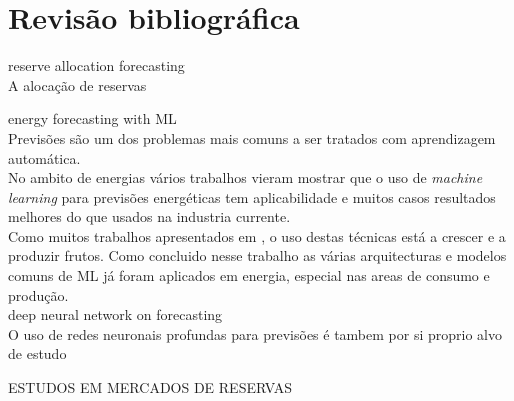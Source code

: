 \chapter{Revisão bibliográfica}

reserve allocation forecasting \\
A alocação de reservas 


energy forecasting with ML \\
Previsões são um dos problemas mais comuns a ser tratados com aprendizagem automática. \cite{} \\
No ambito de energias vários trabalhos vieram mostrar que o uso de \textit{machine learning} para previsões energéticas tem aplicabilidade e muitos casos resultados melhores do que usados na industria currente. \cite{Ahmad2020} \cite{Antonopoulos2020} \\  
Como muitos trabalhos apresentados em \cite{Benti2023}, o uso destas técnicas está a crescer e a produzir frutos. Como concluido nesse trabalho as várias arquitecturas e modelos comuns de ML já foram aplicados em energia, especial nas areas de consumo e produção. \\

deep neural network on forecasting\\
O uso de redes neuronais profundas para previsões é tambem por si proprio alvo de estudo



ESTUDOS EM MERCADOS DE RESERVAS \cite{Rassid2017}





